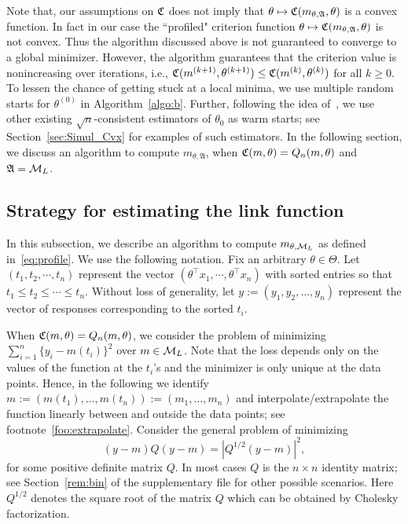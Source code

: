 Note that, our assumptions on $\mathfrak{C}$ does not imply that  $\theta \mapsto \mathfrak{C}(m_{\theta, \mathfrak{A}}, \theta)$  is a convex function. In fact in our case the ``profiled" criterion function $\theta \mapsto \mathfrak{C}(m_{\theta, \mathfrak{A}}, \theta)$ is not convex. Thus the algorithm discussed above is not guaranteed to converge to a global minimizer. However, the algorithm guarantees that the criterion value is nonincreasing over iterations, i.e., $\mathfrak{C}(m^{(k+1)},\theta^{(k+1)})\le \mathfrak{C}(m^{(k)},\theta^{(k)})$ for all $k\ge 0.$ { To lessen the chance of getting stuck at a local minima,  we use multiple random starts for $\theta^{(0)}$ in Algorithm~\ref{algo:b}. Further, following the idea of~\cite{dumbgen2013stochastic}, we use other existing $\sqrt{n}$-consistent estimators of $\theta_0$ as warm starts; see Section~\ref{sec:Simul_Cvx} for examples of such estimators.} In the following section,  we discuss an algorithm to compute $m_{\theta,\mathfrak{A}}$, when $\mathfrak{C}(m, \theta)=Q_n(m, \theta)$ and $\mathfrak{A} =\mathcal{M}_L$.%
\subsection{Strategy for estimating the link function} \label{sec:CLSE_comp}
In this subsection, we describe an algorithm to compute  $m_{\theta, \mathcal{M}_L}$ as defined in~\eqref{eq:profile}. We use the following notation. Fix an arbitrary $\theta\in\Theta$. Let $(t_1, t_2, \cdots, t_n)$ represent the vector $(\theta ^\top x_1, \cdots, \theta ^\top x_n)$ with sorted entries so that $t_1 \le t_2 \le \cdots \le t_n$. Without loss of generality, let $y := (y_1, y_2, \ldots, y_n)$ represent the vector of responses corresponding to the sorted $t_i$.

When $\mathfrak{C}(m, \theta)=Q_n(m, \theta)$, we consider the problem of minimizing $\sum_{i=1}^n \{y_i - m(t_i)\}^2$ over $m\in\mathcal{M}_L$.  Note that the loss depends  only on the values of the function at the $t_i$'s and the minimizer is only unique at the data points.  Hence, in the following we identify $m:= (m(t_1), \ldots, m(t_n)):= (m_1, \ldots, m_n)$ and interpolate/extrapolate the function linearly between and outside the data points; see footnote~\ref{foo:extrapolate}. Consider the general problem of minimizing
\[
(y - m)Q(y - m) = |Q^{1/2}(y - m)|^2,
\]
for some positive definite matrix $Q$. In most cases $Q$ is the $n\times n$ identity matrix; see Section~\ref{rem:bin} of the supplementary file for other possible scenarios. Here $Q^{1/2}$ denotes the square root of the matrix $Q$ which can be obtained by Cholesky factorization.


